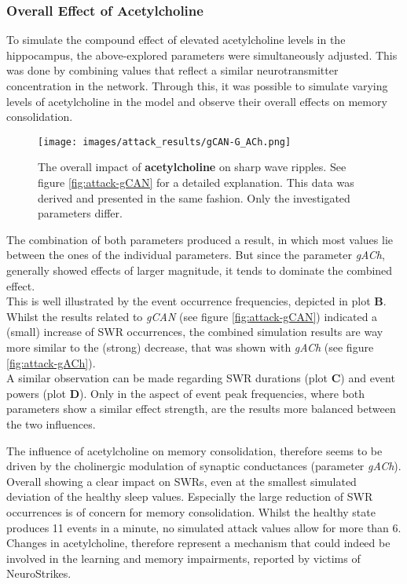         \subsubsection{Overall Effect of Acetylcholine}
        To simulate the compound effect of elevated acetylcholine levels in the hippocampus, the above-explored parameters were simultaneously adjusted. This was done by combining values that reflect a similar neurotransmitter concentration in the network. Through this, it was possible to simulate varying levels of acetylcholine in the model and observe their overall effects on memory consolidation.

        \begin{figure}[htbp]
            \centering
            \texttt{[image: images/attack\_results/gCAN-G\_ACh.png]}
            \caption{The overall impact of \textbf{acetylcholine} on sharp wave ripples. See figure \ref{fig:attack-gCAN} for a detailed explanation. This data was derived and presented in the same fashion. Only the investigated parameters differ.}
            \label{fig:attack-acetylcholine}
        \end{figure}
        The combination of both parameters produced a result, in which most values lie between the ones of the individual parameters. But since the parameter \textit{gACh}, generally showed effects of larger magnitude, it tends to dominate the combined effect.\\
        This is well illustrated by the event occurrence frequencies, depicted in plot \textbf{B}. Whilst the results related to \textit{gCAN} (see figure \ref{fig:attack-gCAN}) indicated a (small) increase of SWR occurrences, the combined simulation results are way more similar to the (strong) decrease, that was shown with \textit{gACh} (see figure \ref{fig:attack-gACh}).\\
        A similar observation can be made regarding SWR durations (plot \textbf{C}) and event powers (plot \textbf{D}). Only in the aspect of event peak frequencies, where both parameters show a similar effect strength, are the results more balanced between the two influences.

        The influence of acetylcholine on memory consolidation, therefore seems to be driven by the cholinergic modulation of synaptic conductances (parameter \textit{gACh}). Overall showing a clear impact on SWRs, even at the smallest simulated deviation of the healthy sleep values. Especially the large reduction of SWR occurrences is of concern for memory consolidation. Whilst the healthy state produces 11 events in a minute, no simulated attack values allow for more than 6.\\
        Changes in acetylcholine, therefore represent a mechanism that could indeed be involved in the learning and memory impairments, reported by victims of NeuroStrikes. 
        

